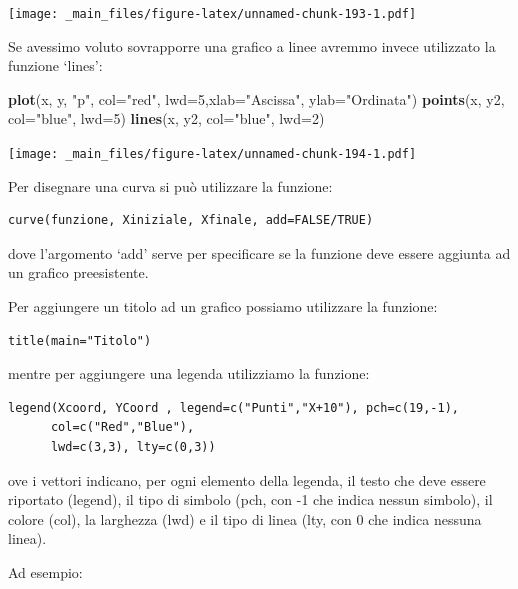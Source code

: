 \documentclass[a4paper,12pt,oneside]{book}
\newenvironment{Shaded}{\begin{snugshade}}{\end{snugshade}}
\newcommand{\KeywordTok}[1]{\textcolor[rgb]{0.13,0.29,0.53}{\textbf{#1}}}
\newcommand{\DataTypeTok}[1]{\textcolor[rgb]{0.13,0.29,0.53}{#1}}
\newcommand{\DecValTok}[1]{\textcolor[rgb]{0.00,0.00,0.81}{#1}}
\newcommand{\StringTok}[1]{\textcolor[rgb]{0.31,0.60,0.02}{#1}}
\newcommand{\NormalTok}[1]{#1}
\theoremstyle{definition}
\theoremstyle{definition}
\theoremstyle{definition}
\theoremstyle{remark}
\begin{document}
\texttt{[image: \_main\_files/figure-latex/unnamed-chunk-193-1.pdf]}

Se avessimo voluto sovrapporre una grafico a linee avremmo invece
utilizzato la funzione `lines':

\begin{Shaded}
\begin{Highlighting}[]
\KeywordTok{plot}\NormalTok{(x, y, }\StringTok{"p"}\NormalTok{, }\DataTypeTok{col=}\StringTok{"red"}\NormalTok{, }\DataTypeTok{lwd=}\DecValTok{5}\NormalTok{,}\DataTypeTok{xlab=}\StringTok{"Ascissa"}\NormalTok{, }\DataTypeTok{ylab=}\StringTok{"Ordinata"}\NormalTok{)}
\KeywordTok{points}\NormalTok{(x, y2, }\DataTypeTok{col=}\StringTok{"blue"}\NormalTok{, }\DataTypeTok{lwd=}\DecValTok{5}\NormalTok{)}
\KeywordTok{lines}\NormalTok{(x, y2, }\DataTypeTok{col=}\StringTok{"blue"}\NormalTok{, }\DataTypeTok{lwd=}\DecValTok{2}\NormalTok{)}
\end{Highlighting}
\end{Shaded}

\texttt{[image: \_main\_files/figure-latex/unnamed-chunk-194-1.pdf]}

Per disegnare una curva si può utilizzare la funzione:

\begin{verbatim}
curve(funzione, Xiniziale, Xfinale, add=FALSE/TRUE)
\end{verbatim}

dove l'argomento `add' serve per specificare se la funzione deve essere
aggiunta ad un grafico preesistente.

Per aggiungere un titolo ad un grafico possiamo utilizzare la funzione:

\begin{verbatim}
title(main="Titolo")
\end{verbatim}

mentre per aggiungere una legenda utilizziamo la funzione:

\begin{verbatim}
legend(Xcoord, YCoord , legend=c("Punti","X+10"), pch=c(19,-1),
      col=c("Red","Blue"),
      lwd=c(3,3), lty=c(0,3))
\end{verbatim}

ove i vettori indicano, per ogni elemento della legenda, il testo che
deve essere riportato (legend), il tipo di simbolo (pch, con -1 che
indica nessun simbolo), il colore (col), la larghezza (lwd) e il tipo di
linea (lty, con 0 che indica nessuna linea).

Ad esempio:
\end{document}
